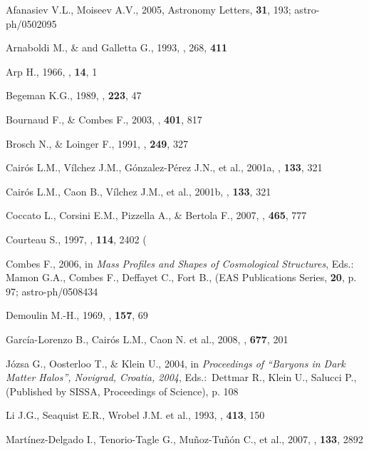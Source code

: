 \documentclass{ab}
\begin{document}
\begin{thebibliography}{}

Afanasiev V.L.,  Moiseev A.V., 2005, Astronomy Letters, {\bf 31}, 193; astro-ph/0502095


Arnaboldi M., \&  and Galletta G., 1993, \aap, 268, \textbf{411}

Arp H., 1966, \apjs, \textbf{14}, 1

Begeman K.G., 1989, \aap, \textbf{223}, 47

Bournaud F., \& Combes F., 2003, \aap, \textbf{401}, 817

Brosch N., \& Loinger F., 1991,  \aap, \textbf{249}, 327

Cair\'{o}s L.M., V\'{i}lchez J.M., G\'{o}nzalez-P\'{e}rez J.N., et al., 2001a, \apjs, \textbf{133}, 321

Cair\'{o}s L.M.,   Caon B., V\'{i}lchez J.M., et al., 2001b, \apjs,  \textbf{133}, 321

Coccato L., Corsini E.M., Pizzella A., \&  Bertola F., 2007, \aap, \textbf{465}, 777

Courteau S., 1997, \aj, \textbf{114}, 2402 ( 

Combes F., 2006, in \textit{Mass Profiles and Shapes of Cosmological Structures}, Eds.: Mamon G.A., Combes F., Deffayet C., Fort B., (EAS Publications Series, \textbf{20}, p. 97; astro-ph/0508434

Demoulin M.-H.,  1969, \apj, \textbf{157}, 69

Garc\'{i}a-Lorenzo B., Cair\'{o}s L.M., Caon N. et al., 2008, \apj, {\bf 677}, 201

J\'{o}zsa G., Oosterloo T., \& Klein U., 2004, in {\it Proceedings of ``Baryons in Dark Matter Halos'', Novigrad, Croatia,  2004}, Eds.:\ Dettmar R., Klein U., Salucci P.,  (Published by SISSA, Proceedings of Science), p. 108

Li J.G., Seaquist E.R., Wrobel J.M. et al., 1993,  \apj, \textbf{413}, 150

Mart\'{i}nez-Delgado I., Tenorio-Tagle  G.,  Mu\~{n}oz-Tu\~{n}\'{o}n C., et al., 2007, \aj, \textbf{133}, 2892


\end{thebibliography}
\end{document}
